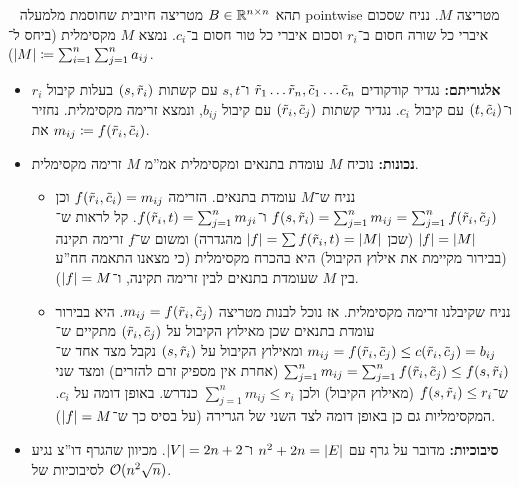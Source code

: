 \documentclass[]{article}
\begin{document}
	\newpage \ \newpage 
	תהא $B \in \mathbb{R}^{n \times n}$ מטריצה חיובית שחוסמת מלמעלה pointwise מטריצה $M$. נניח שסכום איברי כל שורה חסום ב־$r_i$ וסכום איברי כל טור חסום ב־$c_i$. נמצא $M$ מקסימלית (ביחס ל־$\left \lvert M \right \rvert \coloneqq \sum_{i = 1}^{n}\sum_{j = 1}^{n}a_{ij}$). 
	\begin{itemize}
		\item \textbf{אלגוריתם: }נגדיר קודקודים $\tilde r_1 \dots \tilde r_n, \tilde c_1 \dots \tilde c_n$ ו־$s, t$ עם קשתות $(s, \tilde r_i)$ בעלות קיבול $r_i$ ו־$(t, \tilde c_i)$ עם קיבול $c_i$. נגדיר קשתות $(\tilde r_i, \tilde c_j)$ עם קיבול $b_{ij}$, ונמצא זרימה מקסימלית. נחזיר את $m_{ij} \coloneqq f(\tilde r_i, \tilde c_i)$. 
		\item \textbf{נכונות: }נוכיח $M$ עומדת בתנאים ומקסימלית אמ''מ $M$ זרימה מקסימלית. 
		\begin{itemize}
			\item[$\implies$]נניח ש־$M$ עומדת בתנאים. הזרימה $f(\tilde r_i, \tilde c_i) = m_{ij}$ וכן $f(s, \tilde r_i) = \sum_{j = 1}^{n}m_{ij} = \sum_{j = 1}^{n}f(\tilde r_i, \tilde c_j)$ ו־$f(\tilde r_i, t) = \sum_{j = 1}^{n}m_{ji}$. קל לראות ש־$\left \lvert f \right \rvert = \left \lvert M \right \rvert$ (שכן $\left \lvert f \right \rvert = \sum f(\tilde r_i, t) = \left \lvert M \right \rvert$ מהגדרה) ומשום ש־$f$ זרימה תקינה (בבירור מקיימת את אילוץ הקיבול) היא בהכרח מקסימלית (כי מצאנו התאמה חח''ע בין $M$ שעומדת בתנאים לבין זרימה תקינה, ו־$\left \lvert f \right \rvert = M$). 
			\item[$\impliedby$]נניח שקיבלנו זרימה מקסימלית. אז נוכל לבנות מטריצה $m_{ij} = f(\tilde r_i, \tilde c_j)$. היא בבירור עומדת בתנאים שכן מאילוץ הקיבול על $(\tilde r_i, \tilde c_j)$ מתקיים ש־$m_{ij} = f(\tilde r_i, \tilde c_j) \le c(\tilde r_i, \tilde c_j) = b_{ij}$ ומאילוץ הקיבול על $(s, \tilde r_i)$ נקבל מצד אחד ש־$\sum_{j = 1}^{n}m_{ij} = \sum_{j = 1}^{n} f(\tilde r_i, \tilde c_j) \le f(s, \tilde r_i)$ (אחרת אין מספיק זרם להזרים) ומצד שני ש־$f(s, \tilde r_i) \le r_i$ (מאילוץ הקיבול) ולכן $\sum_{j = 1}^{n}m_{ij} \le r_i$ כנדרש. באופן דומה על $c_i$. המקסימליות גם כן באופן דומה לצד השני של הגרירה (על בסיס כך ש־$\left \lvert f \right \rvert = M$). 
		\end{itemize}
		\item \textbf{סיבוכיות: }מדובר על גרף עם $n^{2} + 2n = \left \lvert E \right \rvert$ ו־$\left \lvert V \right \rvert = 2n + 2$. מכיוון שהגרף דו''צ נגיע לסיבוכיות של $\mathcal{O}(n^{2}\sqrt n)$. 
	\end{itemize}
	
\end{document}
